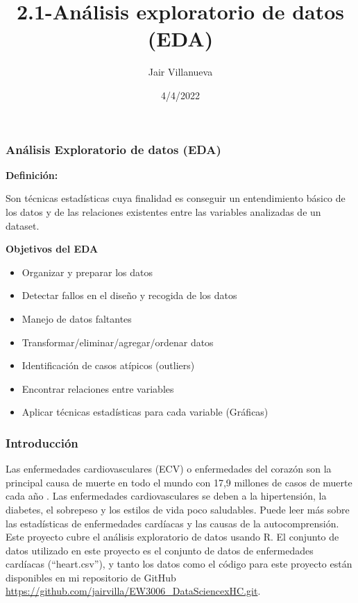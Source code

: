 \documentclass[
]{article}
\title{2.1-Análisis exploratorio de datos (EDA)}
\author{Jair Villanueva}
\date{4/4/2022}
\providecommand{\tightlist}{%
  \setlength{\itemsep}{0pt}\setlength{\parskip}{0pt}}
\begin{document}
\maketitle

\hypertarget{anuxe1lisis-exploratorio-de-datos-eda}{%
\subsubsection{Análisis Exploratorio de datos
(EDA)}\label{anuxe1lisis-exploratorio-de-datos-eda}}

\textbf{Definición:}

Son técnicas estadísticas cuya finalidad es conseguir un entendimiento
básico de los datos y de las relaciones existentes entre las variables
analizadas de un dataset.

\textbf{Objetivos del EDA}

\begin{itemize}
\tightlist
\item
  Organizar y preparar los datos
\item
  Detectar fallos en el diseño y recogida de los datos
\item
  Manejo de datos faltantes
\item
  Transformar/eliminar/agregar/ordenar datos
\item
  Identificación de casos atípicos (outliers)
\item
  Encontrar relaciones entre variables
\item
  Aplicar técnicas estadísticas para cada variable (Gráficas)
\end{itemize}

\hypertarget{introducciuxf3n}{%
\subsubsection{Introducción}\label{introducciuxf3n}}

Las enfermedades cardiovasculares (ECV) o enfermedades del corazón son
la principal causa de muerte en todo el mundo con 17,9 millones de casos
de muerte cada año . Las enfermedades cardiovasculares se deben a la
hipertensión, la diabetes, el sobrepeso y los estilos de vida poco
saludables. Puede leer más sobre las estadísticas de enfermedades
cardíacas y las causas de la autocomprensión. Este proyecto cubre el
análisis exploratorio de datos usando R. El conjunto de datos utilizado
en este proyecto es el conjunto de datos de enfermedades cardíacas
(``heart.csv''), y tanto los datos como el código para este proyecto
están disponibles en mi repositorio de GitHub
\href{Ew3006-DataSciencexHC}{https://github.com/jairvilla/EW3006\_DataSciencexHC.git}.
\end{document}
